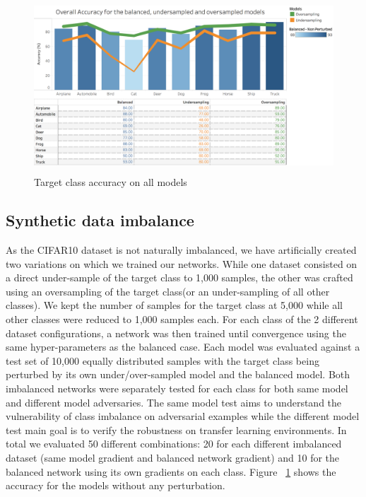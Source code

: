 \documentclass[runningheads,a4paper]{llncs}
\begin{document}
\begin{figure}
	\centering
	\includegraphics[height=6.5cm]{graph_non_pert.png}
	\caption{Target class accuracy on all models}
	\label{fig:acc_graph}
\end{figure}

\subsection{Synthetic data imbalance}

As the CIFAR10 dataset is not naturally imbalanced, we have artificially created two variations on which we trained our networks.  While one dataset consisted on a direct under-sample of the target class to 1,000 samples, the other was crafted using  an oversampling of the target class(or an under-sampling of all other classes). We kept the number of samples for the target class at 5,000 while all other classes were reduced to 1,000 samples each. For each class of the 2 different dataset configurations, a network was then trained until convergence using the same hyper-parameters as the balanced case. Each model was evaluated against a test set of 10,000 equally distributed samples with the target class being perturbed by its own under/over-sampled model and the balanced model. Both imbalanced networks were separately tested for each class for both same model and different model adversaries. The same model test aims to understand the vulnerability of class imbalance on adversarial examples while the different model test main goal is to verify the robustness on transfer learning environments. In total we evaluated 50 different combinations: 20 for each different imbalanced dataset (same model gradient and balanced network gradient) and 10 for the balanced network using its own gradients on each class. Figure ~\ref{fig:acc_graph} shows the accuracy for the models without any perturbation.
\end{document}
